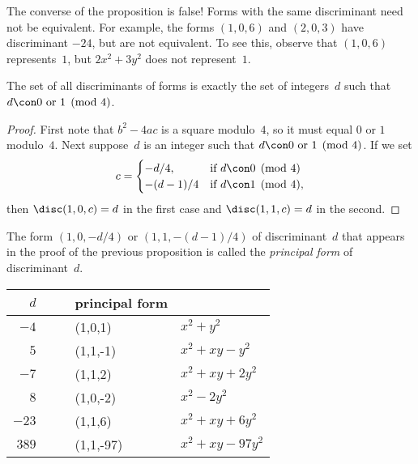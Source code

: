 \documentclass[11pt]{report}
\begin{document}
 The converse of the proposition is false!
Forms with the same discriminant need not be equivalent.  For example,
the forms $(1,0,6)$ and $(2,0,3)$ have discriminant $-24$, but are not
equivalent.  To see this, observe that $(1,0,6)$ represents~$1$, but
$2x^2 + 3y^2$ does not represent~$1$.

\begin{proposition}
  The set of all discriminants of forms is exactly the set of integers~$d$
  such that $d\con 0\text{ or }1\pmod{4}$.
\end{proposition}
\begin{proof}
  First note that $b^2-4ac$ is a square modulo~$4$, so it must equal $0$
  or $1$ modulo~$4$.  Next suppose~$d$ is an integer
  such that $d\con 0\text{ or }1\pmod{4}$.   If we set
  $$
    c = \begin{cases}
      -d/4,    & \text{if $d\con 0\pmod{4}$}  \\
      -(d-1)/4 & \text{if $d\con 1\pmod{4}$},
    \end{cases}
  $$
  then $\disc(1,0,c)=d$ in the first case and
  $\disc(1,1,c)=d$ in the second.
\end{proof}

\begin{definition}
  The form $(1,0,-d/4)$ or $(1,1,-(d-1)/4)$ of discriminant~$d$ that
  appears in the proof of the previous proposition is called the
    {\em principal form} of discriminant~$d$.
\end{definition}

\begin{center}
  \begin{tabular}{rc|cll}
    $d$   &  &  & principal form &                    \\\hline
    $-4$  &  &  & (1,0,1)        & $x^2 + y^2$        \\
    $5$   &  &  & (1,1,-1)       & $x^2 + xy-y^2$     \\
    $-7$  &  &  & (1,1,2)        & $x^2 + xy+2y^2$    \\
    $8$   &  &  & (1,0,-2)       & $x^2 - 2y^2$       \\
    $-23$ &  &  & (1,1,6)        & $x^2 + xy + 6y^2$  \\
    $389$ &  &  & (1,1,-97)      & $x^2 + xy - 97y^2$
  \end{tabular}
\end{center}
\end{document}
